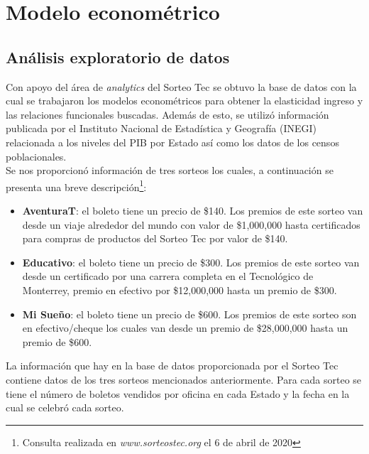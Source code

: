 \chapter{Modelo econométrico}



\section{Análisis exploratorio de datos}

\noindent Con apoyo del área de \textit{analytics} del Sorteo Tec se obtuvo la base de datos con la cual se trabajaron los modelos econométricos para obtener la elasticidad ingreso y las relaciones funcionales buscadas. Además de esto, se utilizó información publicada por el Instituto Nacional de Estadística y Geografía (INEGI) relacionada a los niveles del PIB por Estado así como los datos de los censos poblacionales. \\

Se nos proporcionó información de tres sorteos los cuales, a continuación se presenta una breve descripción\footnote{Consulta realizada en \textit{www.sorteostec.org} el 6 de abril de 2020}: 

\begin{itemize}
    
    \item \textbf{AventuraT}: el boleto tiene un precio de \$140. Los premios de este sorteo van desde un viaje alrededor del mundo con valor de \$1,000,000 hasta certificados para compras de productos del Sorteo Tec por valor de \$140.
    
    \item \textbf{Educativo}: el boleto tiene un precio de \$300. Los premios de este sorteo van desde un certificado por una carrera completa en el Tecnológico de Monterrey, premio en efectivo por \$12,000,000 hasta un premio de \$300.
    
    \item \textbf{Mi Sueño}: el boleto tiene un precio de \$600. Los premios de este sorteo son en efectivo/cheque los cuales van desde un premio de \$28,000,000 hasta un premio de \$600.
    
    
\end{itemize}

La información que hay en la base de datos proporcionada por el Sorteo Tec contiene datos de los tres sorteos mencionados anteriormente. Para cada sorteo se tiene el número de boletos vendidos por oficina en cada Estado y la fecha en la cual se celebró cada sorteo. \\

